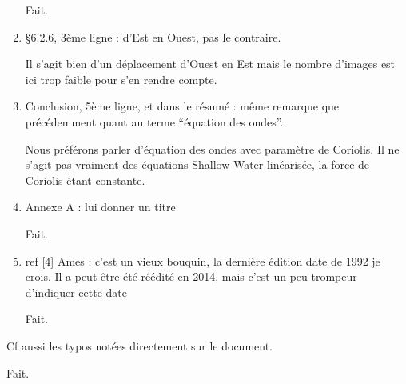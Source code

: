 \documentclass[10pt,a4paper]{article}
\begin{document}
\begin{enumerate}
{\color{blue} Fait.} 

\item §6.2.6, 3ème ligne : d’Est en Ouest, pas le contraire.

{\color{blue} Il s'agit bien d'un déplacement d'Ouest en Est mais le nombre d'images est ici trop faible pour s'en rendre compte.} 

\item Conclusion, 5ème ligne, et dans le résumé : même remarque que précédemment quant
au terme “équation des ondes”.

{\color{blue} Nous préférons parler d'équation des ondes avec paramètre de Coriolis. Il ne s'agit pas vraiment des équations Shallow Water linéarisée, la force de Coriolis étant constante.} 

\item Annexe A : lui donner un titre

{\color{blue} Fait.} 


\item ref [4] Ames : c’est un vieux bouquin, la dernière édition date de 1992 je crois. Il a
peut-être été réédité en 2014, mais c’est un peu trompeur d’indiquer cette date

{\color{blue} Fait.} 










\end{enumerate}

Cf aussi les typos notées directement sur le document.

{\color{blue} Fait.} 
\end{document}

